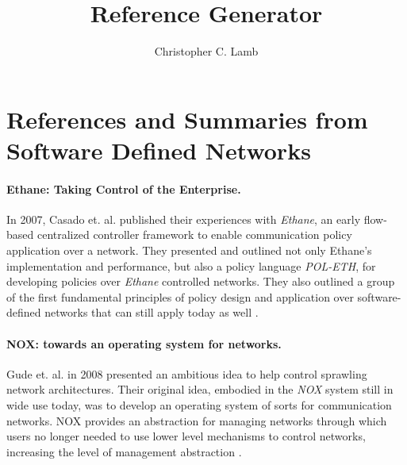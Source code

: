 \documentclass[10pt,letterpaper]{article}
\author{Christopher C. Lamb}
\title{Reference Generator}
\begin{document}
\section{References and Summaries from Software Defined Networks}

\paragraph{Ethane: Taking Control of the Enterprise.} In 2007, Casado et. al. published their experiences with {\sl Ethane}, an early flow-based centralized controller framework to enable communication policy application over a network.  They presented and outlined not only Ethane's implementation and performance, but also a policy language {\sl POL-ETH}, for developing policies over {\sl Ethane} controlled networks.  They also outlined a group of the first fundamental principles of policy design and application over software-defined networks that can still apply today as well \cite{CaFrPeLu:07}.

\paragraph{NOX: towards an operating system for networks.}  Gude et. al. in 2008 presented an ambitious idea to help control sprawling network architectures.  Their original idea, embodied in the {\sl NOX} system still in wide use today, was to develop an operating system of sorts for communication networks.  NOX provides an abstraction for managing networks through which users no longer needed to use lower level mechanisms to control networks, increasing the level of management abstraction \cite{GuKoPePf:08}.



\end{document}
